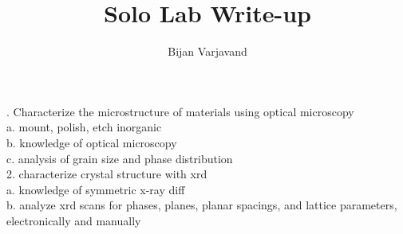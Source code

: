 \documentclass{article}
\author{Bijan Varjavand}
\title{Solo Lab Write-up}
\begin{document}
. Characterize the microstructure of materials using optical microscopy\\
a. mount, polish, etch inorganic\\
b. knowledge of optical microscopy\\
c. analysis of grain size and phase distribution\\

2. characterize crystal structure with xrd\\
a. knowledge of symmetric x-ray diff\\
b. analyze xrd scans for phases, planes, planar spacings, and lattice parameters, electronically and manually
\end{document}
